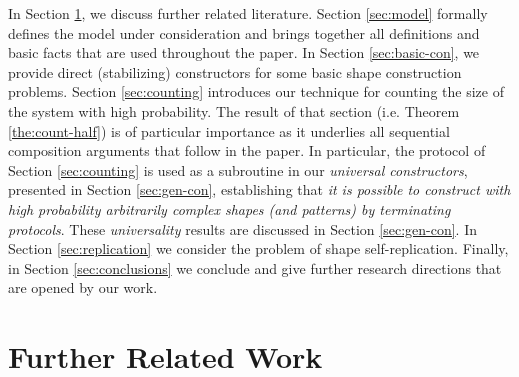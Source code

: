 \documentclass[oribibl, 11pt]{llncs}
\begin{document}
In Section \ref{sec:rw}, we discuss further related literature. Section \ref{sec:model} formally defines the model under consideration and brings together all definitions and basic facts that are used throughout the paper. In Section \ref{sec:basic-con}, we provide direct (stabilizing) constructors for some basic shape construction problems. Section \ref{sec:counting} introduces our technique for counting the size  of the system with high probability. The result of that section (i.e. Theorem \ref{the:count-half}) is of particular importance as it underlies all sequential composition arguments that follow in the paper. In particular, the protocol of Section \ref{sec:counting} is used as a subroutine in our \emph{universal constructors}, presented in Section \ref{sec:gen-con}, establishing that \emph{it is possible to construct with high probability arbitrarily complex shapes (and patterns) by terminating protocols}. These \emph{universality} results are discussed in Section \ref{sec:gen-con}. In Section \ref{sec:replication} we consider the problem of shape self-replication. Finally, in Section \ref{sec:conclusions} we conclude and give further research directions that are opened by our work.

\section{Further Related Work}
\label{sec:rw}
\end{document}
